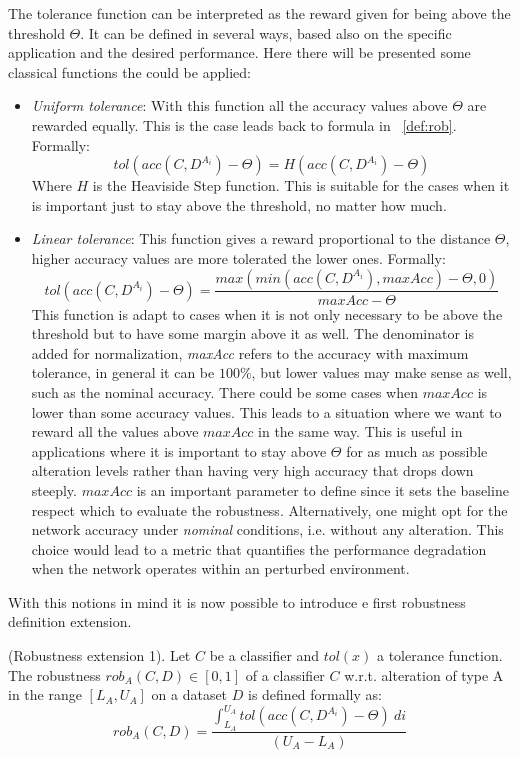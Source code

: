 The tolerance function can be interpreted as the reward given for being above the threshold $\Theta$. It can be defined in several ways, based also on the specific application and the desired performance. Here there will be presented some classical functions the could be applied:

\begin{itemize}
	\item \textit{Uniform tolerance}: With this function all the accuracy values above $\Theta$ are rewarded equally. This is the case leads back to formula in \Def~\ref{def:rob}. Formally: 
	\[
		tol(acc(C,D^{A_i}) - \Theta) = H(acc(C,D^{A_i}) - \Theta)
	\]
	Where $H$ is the Heaviside Step function. This is suitable for the cases when it is important just to stay above the threshold, no matter how much.
	\item \textit{Linear tolerance}: This function gives a reward proportional to the distance $\Theta$, higher accuracy values are more tolerated the lower ones. Formally: 
	\[
		tol(acc(C,D^{A_i}) - \Theta) = \frac{max(min(acc(C,D^{A_i}), maxAcc) - \Theta, 0)}{maxAcc - \Theta}
	\]
	This function is adapt to cases when it is not only necessary to be above the threshold but to have some margin above it as well. The denominator is added for normalization, \textit{maxAcc} refers to the accuracy with maximum tolerance, in general it can be $100\%$, but lower values may make sense as well, such as the nominal accuracy. There could be some cases when $maxAcc$ is lower than some accuracy values. This leads to a situation where we want to reward all the values above $maxAcc$ in the same way. This is useful in applications where it is important to stay above $\Theta$ for as much as possible alteration levels rather than having very high accuracy that drops down steeply. $maxAcc$ is an important parameter to define since it sets the baseline respect which to evaluate the robustness. Alternatively, one might opt for the network accuracy under \textit{nominal} conditions, i.e. without any alteration. This choice would lead to a metric that quantifies the performance degradation when the network operates within an perturbed environment. 
\end{itemize}

With this notions in mind it is now possible to introduce e first robustness definition extension.

\begin{definition} (Robustness extension 1).
	Let $C$ be a classifier and $tol(x)$ a tolerance function.
	The robustness $rob_A(C,D) \in [0,1]$ of a classifier $C$ w.r.t. alteration of type A in the range $[L_A, U_A]$ on a dataset $D$ is defined formally as:
	\[
		rob_A(C,D) = \frac{\int_{L_A}^{U_A} tol(acc(C,D^{A_i}) - \Theta) \ di}{(U_A - L_A)}
	\]
\end{definition}

